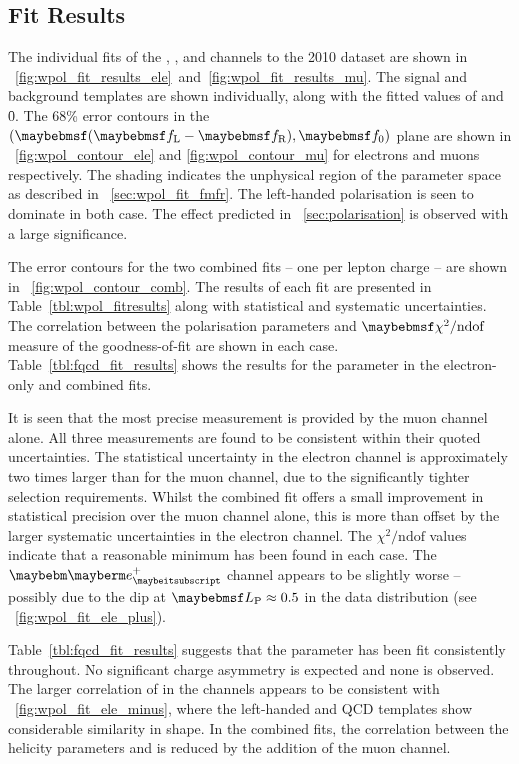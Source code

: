 \subsection{Fit Results}
The individual fits of the \Pep, \Pem, \Pgmp and \Pgmm channels to the 2010
dataset are shown in
\figs~\ref{fig:wpol_fit_results_ele}~and~\ref{fig:wpol_fit_results_mu}. The
signal and background templates are shown individually, along with the fitted
values of \fLmfR and \f0. The 68\% error contours in the $(\fLmfR, \f0)$ plane
are shown in \figs~\ref{fig:wpol_contour_ele} and \ref{fig:wpol_contour_mu} for
electrons and muons respectively. The shading indicates the unphysical region of
the parameter space as described in \sec~\ref{sec:wpol_fit_fmfr}. The
left-handed polarisation is seen to dominate in both case. The effect predicted
in \sec~\ref{sec:polarisation} is observed with a large significance.

The error contours for the two combined fits -- one per lepton charge -- are
shown in \fig~\ref{fig:wpol_contour_comb}. The results of each fit are presented
in Table~\ref{tbl:wpol_fitresults} along with statistical and systematic
uncertainties. The correlation between the polarisation parameters and
$\chisq/\textrm{ndof}$ measure of the goodness-of-fit are shown in each
case. Table~\ref{tbl:fqcd_fit_results} shows the results for the parameter \fQCD
in the electron-only and combined fits.

It is seen that the most precise measurement is provided by the muon channel
alone. All three measurements are found to be consistent within their quoted
uncertainties. The statistical uncertainty in the electron channel is
approximately two times larger than for the muon channel, due to the
significantly tighter selection requirements. Whilst the combined fit offers a
small improvement in statistical precision over the muon channel alone, this is
more than offset by the larger systematic uncertainties in the electron
channel. The $\chi^2/\textrm{ndof}$ values indicate that a reasonable minimum
has been found in each case. The $\Pep$ channel appears to be slightly worse --
possibly due to the dip at $\LP \approx 0.5$ in the data distribution (see
\fig~\ref{fig:wpol_fit_ele_plus}).

Table~\ref{tbl:fqcd_fit_results} suggests that the parameter \fQCD has been fit
consistently throughout. No significant charge asymmetry is expected and none is
observed. The larger correlation of \fLmfR in the \PWm channels appears to be
consistent with \fig~\ref{fig:wpol_fit_ele_minus}, where the left-handed and
\ac{QCD} templates show considerable similarity in shape. In the combined fits,
the correlation between the helicity parameters and \fQCD is reduced by the
addition of the muon channel.

